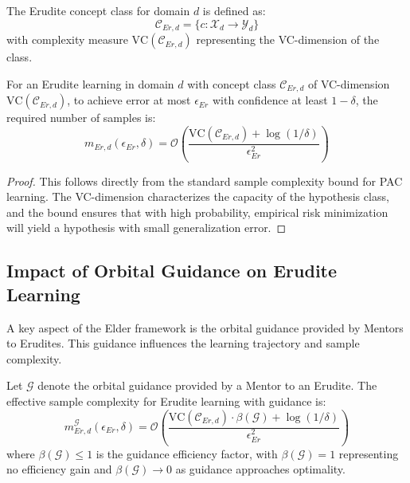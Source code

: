 \begin{definition}
The Erudite concept class for domain $d$ is defined as:
\begin{equation}
\mathcal{C}_{Er,d} = \{c: \mathcal{X}_d \rightarrow \mathcal{Y}_d\}
\end{equation}
with complexity measure $\text{VC}(\mathcal{C}_{Er,d})$ representing the VC-dimension of the class.
\end{definition}

\begin{theorem}
For an Erudite learning in domain $d$ with concept class $\mathcal{C}_{Er,d}$ of VC-dimension $\text{VC}(\mathcal{C}_{Er,d})$, to achieve error at most $\epsilon_{Er}$ with confidence at least $1-\delta$, the required number of samples is:
\begin{equation}
m_{Er,d}(\epsilon_{Er}, \delta) = \mathcal{O}\left(\frac{\text{VC}(\mathcal{C}_{Er,d}) + \log(1/\delta)}{\epsilon_{Er}^2}\right)
\end{equation}
\end{theorem}

\begin{proof}
This follows directly from the standard sample complexity bound for PAC learning. The VC-dimension characterizes the capacity of the hypothesis class, and the bound ensures that with high probability, empirical risk minimization will yield a hypothesis with small generalization error.
\end{proof}

\subsection{Impact of Orbital Guidance on Erudite Learning}

A key aspect of the Elder framework is the orbital guidance provided by Mentors to Erudites. This guidance influences the learning trajectory and sample complexity.

\begin{theorem}
Let $\mathcal{G}$ denote the orbital guidance provided by a Mentor to an Erudite. The effective sample complexity for Erudite learning with guidance is:
\begin{equation}
m_{Er,d}^{\mathcal{G}}(\epsilon_{Er}, \delta) = \mathcal{O}\left(\frac{\text{VC}(\mathcal{C}_{Er,d}) \cdot \beta(\mathcal{G}) + \log(1/\delta)}{\epsilon_{Er}^2}\right)
\end{equation}
where $\beta(\mathcal{G}) \leq 1$ is the guidance efficiency factor, with $\beta(\mathcal{G}) = 1$ representing no efficiency gain and $\beta(\mathcal{G}) \rightarrow 0$ as guidance approaches optimality.
\end{theorem}

